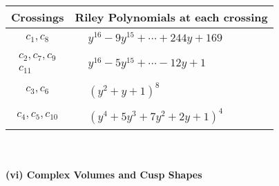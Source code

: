 \documentclass[1p]{elsarticle_modified}
\theoremstyle{definition}
\begin{document}
\begin{tabular}{m{50pt}|m{274pt}}
Crossings & \hspace{64pt}Riley Polynomials at each crossing \\
\hline $$\begin{aligned}c_{1},c_{8}\end{aligned}$$&$\begin{aligned}
&y^{16}-9 y^{15}+\cdots+244 y+169
\end{aligned}$\\
\hline $$\begin{aligned}c_{2},c_{7},c_{9}\\c_{11}\end{aligned}$$&$\begin{aligned}
&y^{16}-5 y^{15}+\cdots-12 y+1
\end{aligned}$\\
\hline $$\begin{aligned}c_{3},c_{6}\end{aligned}$$&$\begin{aligned}
&(y^2+y+1)^8
\end{aligned}$\\
\hline $$\begin{aligned}c_{4},c_{5},c_{10}\end{aligned}$$&$\begin{aligned}
&(y^4+5 y^3+7 y^2+2 y+1)^4
\end{aligned}$\\
\hline
\end{tabular}\\~\\
\newpage\flushleft \textbf{(vi) Complex Volumes and Cusp Shapes}
\end{document}
